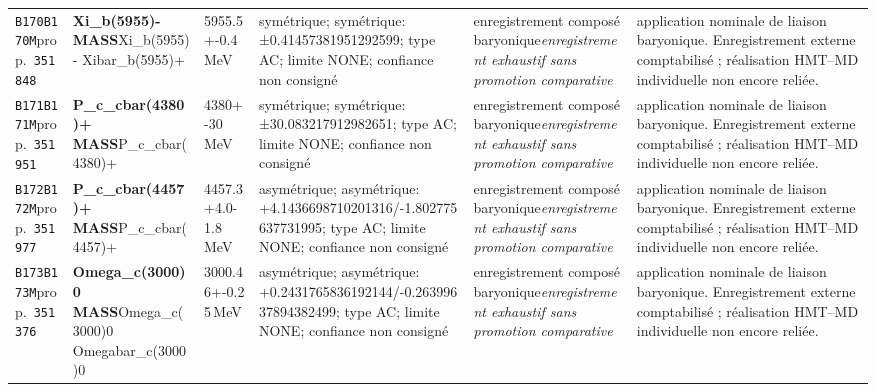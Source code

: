 \begin{landscape}
\begin{longtable}{L{1.85cm}L{4.45cm}L{2.35cm}L{4.05cm}L{3.35cm}L{7.15cm}}
\texttt{B170}\newline \texttt{B170M}\newline prop.\ \texttt{351848} & \textbf{Xi\_\allowbreak{}b(5955)- MASS}\newline Xi\_\allowbreak{}b(5955)- \textbar{}\allowbreak{} Xibar\_\allowbreak{}b(5955)+ & 5955.5+-0.4\,MeV & symétrique; symétrique: ±0.41457381951292599; type AC; limite NONE; confiance non consigné & enregistrement composé baryonique\newline \emph{enregistrement exhaustif sans promotion comparative} & application nominale de liaison baryonique. Enregistrement externe comptabilisé ; réalisation HMT--MD individuelle non encore reliée. \\
\texttt{B171}\newline \texttt{B171M}\newline prop.\ \texttt{351951} & \textbf{P\_\allowbreak{}c\_\allowbreak{}cbar(4380)+ MASS}\newline P\_\allowbreak{}c\_\allowbreak{}cbar(4380)+ & 4380+-30\,MeV & symétrique; symétrique: ±30.083217912982651; type AC; limite NONE; confiance non consigné & enregistrement composé baryonique\newline \emph{enregistrement exhaustif sans promotion comparative} & application nominale de liaison baryonique. Enregistrement externe comptabilisé ; réalisation HMT--MD individuelle non encore reliée. \\
\texttt{B172}\newline \texttt{B172M}\newline prop.\ \texttt{351977} & \textbf{P\_\allowbreak{}c\_\allowbreak{}cbar(4457)+ MASS}\newline P\_\allowbreak{}c\_\allowbreak{}cbar(4457)+ & 4457.3+4.0-1.8\,MeV & asymétrique; asymétrique: +4.1436698710201316/-1.802775637731995; type AC; limite NONE; confiance non consigné & enregistrement composé baryonique\newline \emph{enregistrement exhaustif sans promotion comparative} & application nominale de liaison baryonique. Enregistrement externe comptabilisé ; réalisation HMT--MD individuelle non encore reliée. \\
\texttt{B173}\newline \texttt{B173M}\newline prop.\ \texttt{351376} & \textbf{Omega\_\allowbreak{}c(3000)0 MASS}\newline Omega\_\allowbreak{}c(3000)0 \textbar{}\allowbreak{} Omegabar\_\allowbreak{}c(3000)0 & 3000.46+-0.25\,MeV & asymétrique; asymétrique: +0.2431765836192144/-0.26399637894382499; type AC; limite NONE; confiance non consigné & enregistrement composé baryonique\newline \emph{enregistrement exhaustif sans promotion comparative} & application nominale de liaison baryonique. Enregistrement externe comptabilisé ; réalisation HMT--MD individuelle non encore reliée. \\

\end{longtable}
\end{landscape}
